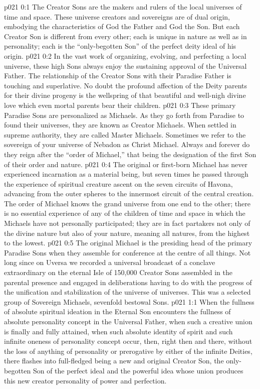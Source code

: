 \author{Perfector of Wisdom}
\vs p021 0:1 The Creator Sons are the makers and rulers of the local universes of time and space. These universe creators and sovereigns are of dual origin, embodying the characteristics of God the Father and God the Son. But each Creator Son is different from every other; each is unique in nature as well as in personality; each is the “only\hyp{}begotten Son” of the perfect deity ideal of his origin.
\vs p021 0:2 In the vast work of organizing, evolving, and perfecting a local universe, these high Sons always enjoy the sustaining approval of the Universal Father. The relationship of the Creator Sons with their Paradise Father is touching and superlative. No doubt the profound affection of the Deity parents for their divine progeny is the wellspring of that beautiful and well\hyp{}nigh divine love which even mortal parents bear their children.
\vs p021 0:3 These primary Paradise Sons are personalized as Michaels. As they go forth from Paradise to found their universes, they are known as Creator Michaels. When settled in supreme authority, they are called Master Michaels. Sometimes we refer to the sovereign of your universe of Nebadon as Christ Michael. Always and forever do they reign after the “order of Michael,” that being the designation of the first Son of their order and nature.
\vs p021 0:4 \pc The original or first\hyp{}born Michael has never experienced incarnation as a material being, but seven times he passed through the experience of spiritual creature ascent on the seven circuits of Havona, advancing from the outer spheres to the innermost circuit of the central creation. The order of Michael knows the grand universe from one end to the other; there is no essential experience of any of the children of time and space in which the Michaels have not personally participated; they are in fact partakers not only of the divine nature but also of your nature, meaning all natures, from the highest to the lowest.
\vs p021 0:5 The original Michael is the presiding head of the primary Paradise Sons when they assemble for conference at the centre of all things. Not long since on Uversa we recorded a universal broadcast of a conclave extraordinary on the eternal Isle of 150,000 Creator Sons assembled in the parental presence and engaged in deliberations having to do with the progress of the unification and stabilization of the universe of universes. This was a selected group of Sovereign Michaels, sevenfold bestowal Sons.
\vs p021 1:1 When the fullness of absolute spiritual ideation in the Eternal Son encounters the fullness of absolute personality concept in the Universal Father, when such a creative union is finally and fully attained, when such absolute identity of spirit and such infinite oneness of personality concept occur, then, right then and there, without the loss of anything of personality or prerogative by either of the infinite Deities, there flashes into full\hyp{}fledged being a new and original Creator Son, the only\hyp{}begotten Son of the perfect ideal and the powerful idea whose union produces this new creator personality of power and perfection.
